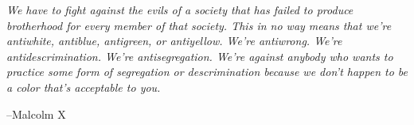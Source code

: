 \documentclass{exam}
\begin{document}
\vspace{1 in}

\ifprintanswers
\else
{\em We have to fight against the evils of a society that has failed to produce brotherhood for every member of that
  society.  This in no way means that we're antiwhite, antiblue, antigreen, or antiyellow.  We're antiwrong.  We're
  antidescrimination.  We're antisegregation.  We're against anybody who wants to practice some form of segregation or
  descrimination because we don't happen to be a color that's acceptable to you.}
\vspace{.2 cm}

\hspace{1 cm} --Malcolm X
\fi
\end{document}
